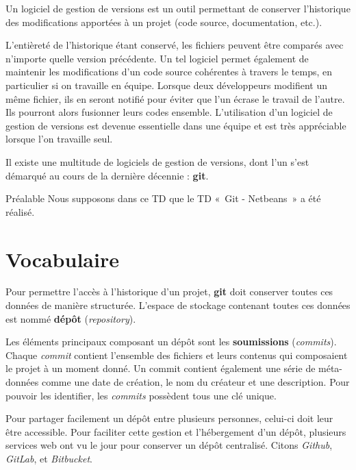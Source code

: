 \documentclass[a4paper,11pt]{style-esi/td}
\newcommand{\git}{\textbf{git}\xspace}
\begin{document}
\entete
\titre
{}
\lastedit

\bigskip

Un logiciel de gestion de versions est un outil permettant de conserver
l’historique des modifications apportées à un projet (code source,
documentation, etc.).

L’entièreté de l’historique étant conservé, les fichiers peuvent être comparés
avec n’importe quelle version précédente.  Un tel logiciel permet également de
maintenir les modifications d’un code source cohérentes à travers le temps, en
particulier si on travaille en équipe. Lorsque deux développeurs modifient un
même fichier, ils en seront notifié pour éviter que l’un écrase le travail de
l’autre. Ils pourront alors fusionner leurs codes ensemble.  L’utilisation d’un
logiciel de gestion de versions est devenue essentielle dans une équipe et est
très appréciable lorsque l’on travaille seul. 

Il existe une multitude de logiciels de gestion de versions, dont l’un s’est
démarqué au cours de la dernière décennie : \textbf{git}.  


\begin{alertit}{Préalable}
	Nous supposons dans ce TD que le TD «~Git - Netbeans~» a été réalisé. 
\end{alertit}

\tableofcontents
\newpage


\section{Vocabulaire}

Pour permettre l’accès à l’historique d’un projet, \git doit conserver toutes
ces données de manière structurée. L’espace de stockage contenant toutes ces
données est nommé \textbf{dépôt} (\textit{repository}). 

Les éléments principaux composant un dépôt sont les \textbf{soumissions}
(\textit{commits}).  Chaque \textit{commit} contient l’ensemble des fichiers et
leurs contenus qui composaient le projet à un moment donné. Un commit contient
également une série de méta-données comme une date de création, le nom du
créateur et une description. Pour pouvoir les identifier, les \textit{commits}
possèdent tous une clé unique. 

Pour partager facilement un dépôt entre plusieurs personnes, celui-ci doit leur 
être accessible. Pour faciliter cette gestion et l'hébergement d’un dépôt, 
plusieurs services web ont vu le jour pour conserver un dépôt centralisé. 
Citons \textit{Github}, \textit{GitLab}, et \textit{Bitbucket}. 
\end{document}
